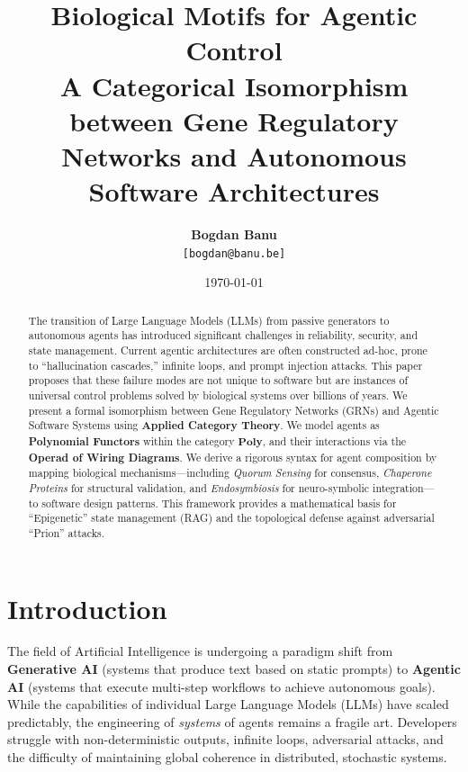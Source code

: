 \documentclass[11pt, a4paper]{article}
\title{\textbf{Biological Motifs for Agentic Control}\\
\large A Categorical Isomorphism between Gene Regulatory Networks and Autonomous Software Architectures}
\author{
    \textbf{Bogdan Banu} \\
    \texttt{[bogdan@banu.be]}
}
\date{\today}
\newcommand{\Poly}{\mathbf{Poly}}
\begin{document}
\maketitle

\begin{abstract}
The transition of Large Language Models (LLMs) from passive generators to autonomous agents has introduced significant challenges in reliability, security, and state management. Current agentic architectures are often constructed ad-hoc, prone to ``hallucination cascades,'' infinite loops, and prompt injection attacks. This paper proposes that these failure modes are not unique to software but are instances of universal control problems solved by biological systems over billions of years. We present a formal isomorphism between Gene Regulatory Networks (GRNs) and Agentic Software Systems using \textbf{Applied Category Theory}. We model agents as \textbf{Polynomial Functors} within the category $\Poly$, and their interactions via the \textbf{Operad of Wiring Diagrams}. We derive a rigorous syntax for agent composition by mapping biological mechanisms---including \textit{Quorum Sensing} for consensus, \textit{Chaperone Proteins} for structural validation, and \textit{Endosymbiosis} for neuro-symbolic integration---to software design patterns. This framework provides a mathematical basis for ``Epigenetic'' state management (RAG) and the topological defense against adversarial ``Prion'' attacks.
\end{abstract}

\section{Introduction}

The field of Artificial Intelligence is undergoing a paradigm shift from \textbf{Generative AI} (systems that produce text based on static prompts) to \textbf{Agentic AI} (systems that execute multi-step workflows to achieve autonomous goals). While the capabilities of individual Large Language Models (LLMs) have scaled predictably, the engineering of \textit{systems} of agents remains a fragile art. Developers struggle with non-deterministic outputs, infinite loops, adversarial attacks, and the difficulty of maintaining global coherence in distributed, stochastic systems.
\end{document}
